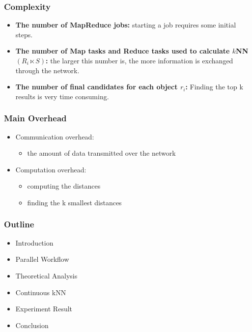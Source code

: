 \begin{frame}
\frametitle{Complexity}

\begin{itemize}
\item \textbf{The number of MapReduce jobs: } starting a job requires some initial steps.

\item \textbf{The number of Map tasks and Reduce tasks used to calculate $k$NN$\left(R_i \ltimes S\right)$: } the larger this number is, the more information is exchanged through the network.

\item \textbf{The number of final candidates for each object $r_i$: }  Finding the top k results is very time consuming. 
\end{itemize}
\end{frame}

\begin{frame}
\frametitle{Main Overhead }
\begin{itemize}
\item Communication overhead:
\begin{itemize}
\item the amount of data transmitted over the network
\end{itemize}
\item Computation overhead:
\begin{itemize}
\item computing the distances
\item finding the k smallest distances
\end{itemize}
\end{itemize}
\end{frame}

\begin{frame}
\frametitle{Outline}
	\begin{itemize}
		\item Introduction
		\item Parallel Workflow
		\item Theoretical Analysis
		\item Continuous kNN
		\item \textcolor{blue!20}{Experiment Result}
		\item \textcolor{blue!20}{Conclusion}
	\end{itemize}
\end{frame}


